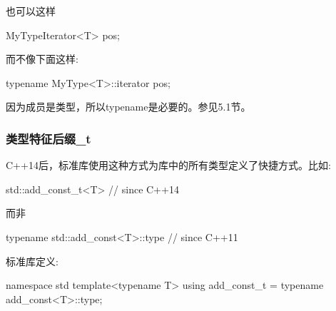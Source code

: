也可以这样

\begin{cpp}
MyTypeIterator<T> pos;
\end{cpp}

而不像下面这样:

\begin{cpp}
typename MyType<T>::iterator pos;
\end{cpp}

\begin{notice}因为成员是类型，所以typename是必要的。参见5.1节。
\end{notice}

\subsubsection{类型特征后缀\_t}

C++14后，标准库使用这种方式为库中的所有类型定义了快捷方式。比如:

\begin{cpp}
std::add_const_t<T> // since C++14
\end{cpp}

而非

\begin{cpp}
typename std::add_const<T>::type // since C++11
\end{cpp}

标准库定义:

\begin{cpp}
namespace std {
	template<typename T> using add_const_t = typename add_const<T>::type;
}
\end{cpp}




